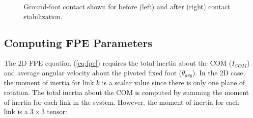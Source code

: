 \begin{figure}[!h]
	\begin{center}
	\end{center}
  	\caption{Ground-foot contact shown for before (left) and after (right) contact stabilization.}
	\label{fig:contact_stabilization}
\end{figure}




\subsection{Computing FPE Parameters} %
\label{sub:computing_fpe_parameters}
The 2D FPE equation (\ref{eq:fpe}) requires the total inertia about the COM ($I_{COM}$) and average angular velocity about the pivoted fixed foot ($\dot{\theta}_{avg}$). In the 2D case, the moment of inertia for link $k$ is a scalar value since there is only one plane of rotation. The total inertia about the COM is computed by summing the moment of inertia for each link in the system. However, the moment of inertia for each link is a $3\times3$ tensor: 

